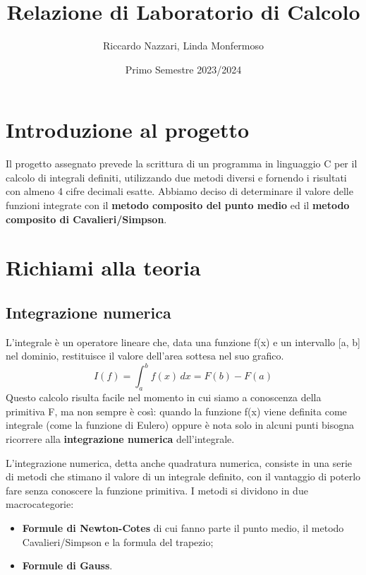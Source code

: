 \documentclass{article}
\title{Relazione di Laboratorio di Calcolo}
\author{Riccardo Nazzari, Linda Monfermoso}
\date{Primo Semestre 2023/2024}
\begin{document}
\maketitle

\section{Introduzione al progetto}
Il progetto assegnato prevede la scrittura di un programma in linguaggio C per il calcolo di integrali definiti,
utilizzando due metodi diversi e fornendo i risultati con almeno 4 cifre decimali esatte. Abbiamo deciso di determinare
il valore delle funzioni integrate con il \textbf{metodo composito del punto medio} ed il \textbf{metodo composito di Cavalieri/Simpson}.
\section{Richiami alla teoria}
\subsection{Integrazione numerica}
L'integrale è un operatore lineare che, data una funzione f(x) e un intervallo [a, b] nel dominio, restituisce il valore 
dell'area sottesa nel suo grafico. 
\begin{equation*}
   I(f) =  \int_{a}^{b} f(x)\, dx = F(b) - F(a)
\end{equation*}
Questo calcolo risulta facile nel momento in cui siamo a conoscenza della primitiva F, ma non sempre è così: quando la funzione
f(x) viene definita come integrale (come la funzione di Eulero) oppure è nota solo in alcuni punti bisogna ricorrere alla
\textbf{integrazione numerica} dell'integrale.

L'integrazione numerica, detta anche quadratura numerica, consiste in una serie di metodi che stimano il valore di un integrale definito, 
con il vantaggio di poterlo fare senza conoscere la funzione primitiva. I metodi si dividono in due macrocategorie:
\begin{itemize}
   \item \textbf{Formule di Newton-Cotes} di cui fanno parte il punto medio, il metodo Cavalieri/Simpson e la formula del trapezio;
   \item \textbf{Formule di Gauss}.
\end{itemize}
\end{document}
